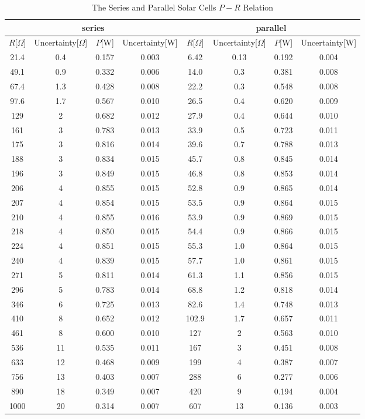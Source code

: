 \documentclass[a4paper]{article}
\begin{document}
    \begin{table}[H]
        \centering
        \begin{tabular}{|c|c|c|c||c|c|c|c|}
            \hline
            \multicolumn{4}{|c||}{series}&\multicolumn{4}{c|}{parallel}\\\hline
            $R$[$\Omega$]&Uncertainty[$\Omega$]&$P$[W]&Uncertainty[W]&$R$[$\Omega$]&Uncertainty[$\Omega$]&$P$[W]&Uncertainty[W]\\\hline
            21.4&0.4&0.157&0.003&6.42&0.13&0.192&0.004\\\hline
            49.1&0.9&0.332&0.006&14.0&0.3&0.381&0.008\\\hline
            67.4&1.3&0.428&0.008&22.2&0.3&0.548&0.008\\\hline
            97.6&1.7&0.567&0.010&26.5&0.4&0.620&0.009\\\hline
            129&2&0.682&0.012&27.9&0.4&0.644&0.010\\\hline
            161&3&0.783&0.013&33.9&0.5&0.723&0.011\\\hline
            175&3&0.816&0.014&39.6&0.7&0.788&0.013\\\hline
            188&3&0.834&0.015&45.7&0.8&0.845&0.014\\\hline
            196&3&0.849&0.015&46.8&0.8&0.853&0.014\\\hline
            206&4&0.855&0.015&52.8&0.9&0.865&0.014\\\hline
            207&4&0.854&0.015&53.5&0.9&0.864&0.015\\\hline
            210&4&0.855&0.016&53.9&0.9&0.869&0.015\\\hline
            218&4&0.850&0.015&54.4&0.9&0.866&0.015\\\hline
            224&4&0.851&0.015&55.3&1.0&0.864&0.015\\\hline
            240&4&0.839&0.015&57.7&1.0&0.861&0.015\\\hline
            271&5&0.811&0.014&61.3&1.1&0.856&0.015\\\hline
            296&5&0.783&0.014&68.8&1.2&0.818&0.014\\\hline
            346&6&0.725&0.013&82.6&1.4&0.748&0.013\\\hline
            410&8&0.652&0.012&102.9&1.7&0.657&0.011\\\hline
            461&8&0.600&0.010&127&2&0.563&0.010\\\hline
            536&11&0.535&0.011&167&3&0.451&0.008\\\hline
            633&12&0.468&0.009&199&4&0.387&0.007\\\hline
            756&13&0.403&0.007&288&6&0.277&0.006\\\hline
            890&18&0.349&0.007&420&9&0.194&0.004\\\hline
            1000&20&0.314&0.007&607&13&0.136&0.003\\\hline
        \end{tabular}
        \caption{The Series and Parallel Solar Cells $P-R$ Relation}
        \label{tab:PvsRsp}
    \end{table}
\end{document}
